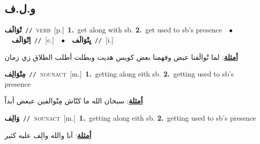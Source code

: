 \documentclass[10pt,a4paper,twoside]{article} %
\begin{document}
\begin{multicols}{2}
\vspace{-3mm}
\subsection*{\color{blue}\foreignlanguage{arabic}{و.ل.ف}\color{blue}{}} 

{\setlength\topsep{0pt}\textbf{\foreignlanguage{arabic}{تْوَالَف}}\ {\color{gray}\texttt{//}\color{black}}\ \textsc{verb}\ [p.]\ \textbf{1.}~get along with sb.  \textbf{2.}~get used to sb's presence\ \ $\bullet$\ \ \setlength\topsep{0pt}\textbf{\foreignlanguage{arabic}{اِتْوَالَف}}\ {\color{gray}\texttt{//}\color{black}}\ [c.]\ \ $\bullet$\ \ \setlength\topsep{0pt}\textbf{\foreignlanguage{arabic}{يِتْوَالَف}}\ {\color{gray}\texttt{//}\color{black}}\ [i.]\  \begin{flushright}\color{gray}\foreignlanguage{arabic}{\textbf{\underline{\foreignlanguage{arabic}{أمثلة}}}: لما تْوالَفنا عبض وفهمنا بعض كويس هديت وبطلت أطلب الطلاق زي زمان}\end{flushright}\color{black}} \vspace{2mm}

{\setlength\topsep{0pt}\textbf{\foreignlanguage{arabic}{مِتْوَالِف}}\ {\color{gray}\texttt{//}\color{black}}\ \textsc{noun\textunderscore act}\ [m.]\ \textbf{1.}~getting along eith sb.  \textbf{2.}~getting used to sb's presence\  \begin{flushright}\color{gray}\foreignlanguage{arabic}{\textbf{\underline{\foreignlanguage{arabic}{أمثلة}}}: سبحان الله ما كنّاش مِتْوالفين عبعض أبداً}\end{flushright}\color{black}} \vspace{2mm}

{\setlength\topsep{0pt}\textbf{\foreignlanguage{arabic}{وَالِف}}\ {\color{gray}\texttt{//}\color{black}}\ \textsc{noun\textunderscore act}\ [m.]\ \textbf{1.}~getting along eith sb.  \textbf{2.}~getting used to sb's presence\  \begin{flushright}\color{gray}\foreignlanguage{arabic}{\textbf{\underline{\foreignlanguage{arabic}{أمثلة}}}: أنا والله والِف عليه كثير}\end{flushright}\color{black}} \vspace{2mm}


\end{multicols}
\end{document}
